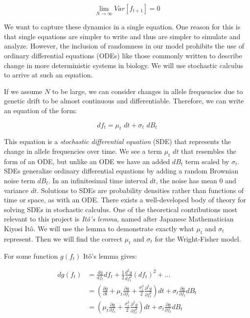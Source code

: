 \begin{equation}\label{eq:var_lim_drift}
    \lim_{N \to \infty} Var[f_{t+1}] = 0
\end{equation}

We want to capture these dynamics in a single equation. One reason for this is that single equations are simpler to write and thus are simpler to simulate and analyze. However, the inclusion of randomness in our model prohibits the use of ordinary differential equations (ODEs) like those commonly written to describe change in more deterministic systems in biology. We will use stochastic calculus to arrive at such an equation.


If we assume $N$ to be large, we can consider changes in allele frequencies due to genetic drift to be almost continuous and differentiable. Therefore, we can write an equation of the form: 

\begin{equation}
    df_t = \mu_t \, \,dt + \sigma_t \, \,dB_t
\end{equation}


This equation is a \textit{stochastic differential equation} (SDE) that represents the change in allele frequencies over time. We see a term $\mu_t \, \, dt$ that resembles the form of an ODE, but unlike an ODE we have an added $dB_t$ term scaled by $\sigma_t$. SDEs generalize ordinary differential equations by adding a random Brownian noise term $dB_{t}$. In an infinitesimal time interval $dt$, the noise has mean $0$ and variance $dt$. Solutions to SDEs are probability densities rather than functions of time or space, as with an ODE. There exists a well-developed body of theory for solving SDEs in stochastic calculus. One of the theoretical contributions most relevant to this project is \textit{It\^{o}'s lemma}, named after Japanese Mathematician Kiyosi It\^{o}. \cite{ito_1944} We will use the lemma to demonstrate exactly what $\mu_t$ and $\sigma_t$ represent. Then we will find the correct $\mu_t$ and $\sigma_t$ for the Wright-Fisher model. 


For some function $g(f_t)$ It\^{o}'s lemma gives:

\begin{equation}
    \begin{split}
        dg(f_t) 
                &= \frac{dg}{df_t}df_t + \frac{1}{2} \frac{d^2g}{df_t^2}(df_t)^2 + ... \\
                &= (\frac{\partial g}{\partial t} + \mu_t \frac{\partial g}{\partial f_t} + \frac{\sigma_t^2}{2} \frac{\partial^2 g}{\partial f_t^2})dt + \sigma_t \frac{\partial g}{\partial f_t}dB_t \\
                &= (\mu_t \frac{\partial g}{\partial f_t} + \frac{\sigma_t^2}{2} \frac{\partial^2 g}{\partial f_t^2})dt + \sigma_t \frac{\partial g}{\partial f_t}dB_t \\
    \end{split}
\end{equation}


